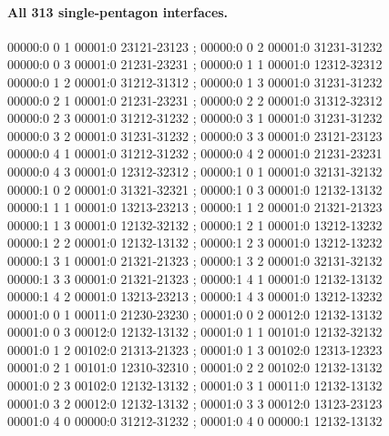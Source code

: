 \documentclass[11pt]{article}
\theoremstyle{remark}
\numberwithin{equation}{section}
\begin{document}
\paragraph{All 313 single-pentagon interfaces.}
\begingroup\footnotesize\ttfamily\begin{flushleft}
00000:0 0 1 00001:0 23121-23123 ; 00000:0 0 2 00001:0 31231-31232\\
00000:0 0 3 00001:0 21231-23231 ; 00000:0 1 1 00001:0 12312-32312\\
00000:0 1 2 00001:0 31212-31312 ; 00000:0 1 3 00001:0 31231-31232\\
00000:0 2 1 00001:0 21231-23231 ; 00000:0 2 2 00001:0 31312-32312\\
00000:0 2 3 00001:0 31212-31232 ; 00000:0 3 1 00001:0 31231-31232\\
00000:0 3 2 00001:0 31231-31232 ; 00000:0 3 3 00001:0 23121-23123\\
00000:0 4 1 00001:0 31212-31232 ; 00000:0 4 2 00001:0 21231-23231\\
00000:0 4 3 00001:0 12312-32312 ; 00000:1 0 1 00001:0 32131-32132\\
00000:1 0 2 00001:0 31321-32321 ; 00000:1 0 3 00001:0 12132-13132\\
00000:1 1 1 00001:0 13213-23213 ; 00000:1 1 2 00001:0 21321-21323\\
00000:1 1 3 00001:0 12132-32132 ; 00000:1 2 1 00001:0 13212-13232\\
00000:1 2 2 00001:0 12132-13132 ; 00000:1 2 3 00001:0 13212-13232\\
00000:1 3 1 00001:0 21321-21323 ; 00000:1 3 2 00001:0 32131-32132\\
00000:1 3 3 00001:0 21321-21323 ; 00000:1 4 1 00001:0 12132-13132\\
00000:1 4 2 00001:0 13213-23213 ; 00000:1 4 3 00001:0 13212-13232\\
00001:0 0 1 00011:0 21230-23230 ; 00001:0 0 2 00012:0 12132-13132\\
00001:0 0 3 00012:0 12132-13132 ; 00001:0 1 1 00101:0 12132-32132\\
00001:0 1 2 00102:0 21313-21323 ; 00001:0 1 3 00102:0 12313-12323\\
00001:0 2 1 00101:0 12310-32310 ; 00001:0 2 2 00102:0 12132-13132\\
00001:0 2 3 00102:0 12132-13132 ; 00001:0 3 1 00011:0 12132-13132\\
00001:0 3 2 00012:0 12132-13132 ; 00001:0 3 3 00012:0 13123-23123\\
00001:0 4 0 00000:0 31212-31232 ; 00001:0 4 0 00000:1 12132-13132\\

\end{flushleft}
\end{document}
